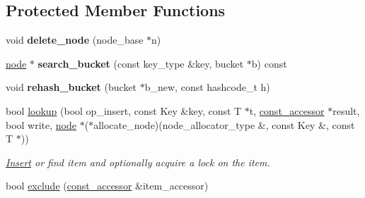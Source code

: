 \subsection*{Protected Member Functions}
\begin{DoxyCompactItemize}
\item 
\hypertarget{classtbb_1_1interface5_1_1concurrent__hash__map_acb1f5cd0e8379a652cb59c07ff952987}{}void {\bfseries delete\+\_\+node} (node\+\_\+base $\ast$n)\label{classtbb_1_1interface5_1_1concurrent__hash__map_acb1f5cd0e8379a652cb59c07ff952987}

\item 
\hypertarget{classtbb_1_1interface5_1_1concurrent__hash__map_a00bdad0b401861e0a04468ee926561d4}{}\hyperlink{structtbb_1_1interface5_1_1concurrent__hash__map_1_1node}{node} $\ast$ {\bfseries search\+\_\+bucket} (const key\+\_\+type \&key, bucket $\ast$b) const \label{classtbb_1_1interface5_1_1concurrent__hash__map_a00bdad0b401861e0a04468ee926561d4}

\item 
\hypertarget{classtbb_1_1interface5_1_1concurrent__hash__map_a7f29734b96e4dfb714200ba1bdf2e427}{}void {\bfseries rehash\+\_\+bucket} (bucket $\ast$b\+\_\+new, const hashcode\+\_\+t h)\label{classtbb_1_1interface5_1_1concurrent__hash__map_a7f29734b96e4dfb714200ba1bdf2e427}

\item 
\hypertarget{classtbb_1_1interface5_1_1concurrent__hash__map_a54c7e526a1dc75509a1f059195d4f24c}{}bool \hyperlink{classtbb_1_1interface5_1_1concurrent__hash__map_a54c7e526a1dc75509a1f059195d4f24c}{lookup} (bool op\+\_\+insert, const Key \&key, const T $\ast$t, \hyperlink{classtbb_1_1interface5_1_1concurrent__hash__map_1_1const__accessor}{const\+\_\+accessor} $\ast$result, bool write, \hyperlink{structtbb_1_1interface5_1_1concurrent__hash__map_1_1node}{node} $\ast$($\ast$allocate\+\_\+node)(node\+\_\+allocator\+\_\+type \&, const Key \&, const T $\ast$))\label{classtbb_1_1interface5_1_1concurrent__hash__map_a54c7e526a1dc75509a1f059195d4f24c}

\begin{DoxyCompactList}\small\item\em \hyperlink{structInsert}{Insert} or find item and optionally acquire a lock on the item. \end{DoxyCompactList}\item 
\hypertarget{classtbb_1_1interface5_1_1concurrent__hash__map_a6fec452b31b8f0e185dc2de64b7128b2}{}bool \hyperlink{classtbb_1_1interface5_1_1concurrent__hash__map_a6fec452b31b8f0e185dc2de64b7128b2}{exclude} (\hyperlink{classtbb_1_1interface5_1_1concurrent__hash__map_1_1const__accessor}{const\+\_\+accessor} \&item\+\_\+accessor)\label{classtbb_1_1interface5_1_1concurrent__hash__map_a6fec452b31b8f0e185dc2de64b7128b2}


\end{DoxyCompactItemize}
